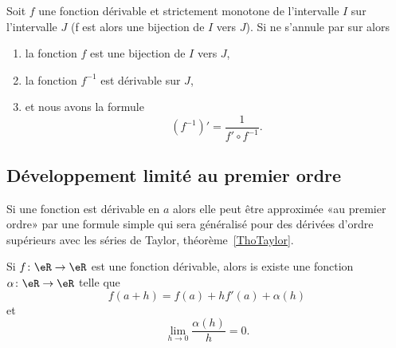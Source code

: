 \begin{proposition}      \label{PROPooSGTBooFxUuXK}
    Soit \(f \) une fonction dérivable et strictement monotone de l'intervalle \( I\) sur l'intervalle \( J\)  (f est alors une bijection de $I$ vers $J$). Si  ne s'annule par sur  alors
    \begin{enumerate}
        \item
            la fonction \( f\) est une bijection de \( I\) vers \( J\),
        \item
            la fonction \( f^{-1}\) est dérivable sur \( J\),
        \item
            et nous avons la formule
            \begin{equation}        \label{EQooELIHooDxUFxH}
                (f^{-1})'=\frac{1}{ f'\circ f^{-1} }.
            \end{equation}
    \end{enumerate}
\end{proposition}

\subsection{Développement limité au premier ordre}

Si une fonction est dérivable en \( a\) alors elle peut être approximée «au premier ordre» par une formule simple qui sera généralisé pour des dérivées d'ordre supérieurs avec les séries de Taylor, théorème~\ref{ThoTaylor}.
\begin{proposition}  \label{PropUTenzfQ}
    Si \( f\colon \eR\to \eR\) est une fonction dérivable, alors is existe une fonction \( \alpha\colon \eR\to \eR\) telle que
    \begin{equation}
        f(a+h)=f(a)+hf'(a)+\alpha(h)
    \end{equation}
    et
    \begin{equation}
        \lim_{h\to 0} \frac{ \alpha(h) }{ h }=0.
    \end{equation}
\end{proposition}

